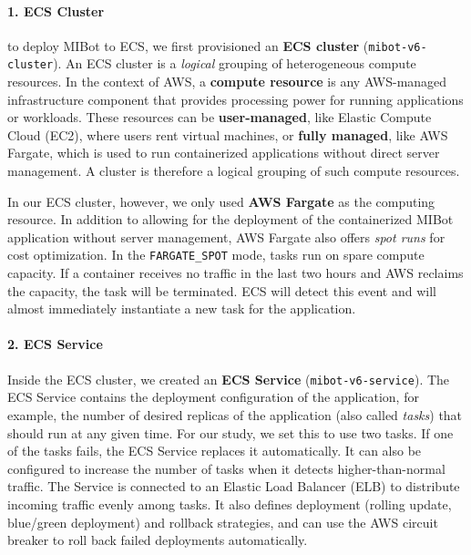 \paragraph{1. ECS Cluster} to deploy MIBot to ECS, we first provisioned an \textbf{ECS cluster} (\texttt{mibot-v6-cluster}). An ECS cluster is a \textit{logical} grouping of heterogeneous compute resources. In the context of AWS, a \textbf{compute resource} is any AWS-managed infrastructure component that provides processing power for running applications or workloads. These resources can be \textbf{user-managed}, like Elastic Compute Cloud (EC2), where users rent virtual machines, or \textbf{fully managed}, like AWS Fargate, which is used to run containerized applications without direct server management. A cluster is therefore a logical grouping of such compute resources.

In our ECS cluster, however, we only used \textbf{AWS Fargate} as the computing resource. In addition to allowing for the deployment of the containerized MIBot application without server management, AWS Fargate also offers \emph{spot runs} for cost optimization. In the \texttt{FARGATE\_SPOT} mode, tasks run on spare compute capacity. If a container receives no traffic in the last two hours and AWS reclaims the capacity, the task will be terminated. ECS will detect this event and will almost immediately instantiate a new task for the application.

\paragraph{2. ECS Service} Inside the ECS cluster, we created an \textbf{ECS Service} (\texttt{mibot-v6-service}). The ECS Service contains the deployment configuration of the application, for example, the number of desired replicas of the application (also called \emph{tasks}) that should run at any given time.  For our study, we set this to use two tasks. If one of the tasks fails, the ECS Service replaces it automatically. It can also be configured to increase the number of tasks when it detects higher-than-normal traffic. The Service is connected to an Elastic Load Balancer (ELB) to distribute incoming traffic evenly among tasks. It also defines deployment (rolling update, blue/green deployment) and rollback strategies, and can use the AWS circuit breaker to roll back failed deployments automatically.


